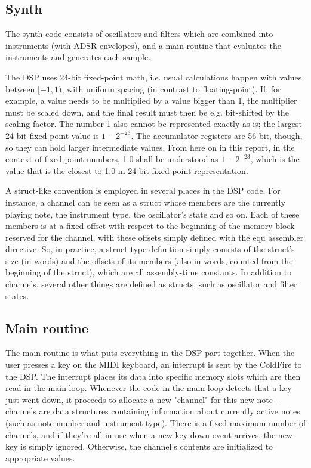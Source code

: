 \documentclass[10pt,a4paper,oneside]{article}
\begin{document}
\subsection{Synth}

The synth code consists of oscillators and filters which are combined into instruments (with ADSR envelopes), and a main routine that evaluates the instruments and generates each sample.

The DSP uses 24-bit fixed-point math, i.e. usual calculations happen with values between $[-1,1)$, with uniform spacing (in contrast to floating-point). If, for example, a value needs to be multiplied by a value bigger than 1, the multiplier must be scaled down, and the final result must then be e.g. bit-shifted by the scaling factor. The number 1 also cannot be represented exactly as-is; the largest 24-bit fixed point value is $1-2^{-23}$. The accumulator registers are 56-bit, though, so they can hold larger intermediate values. From here on in this report, in the context of fixed-point numbers, 1.0 shall be understood as $1-2^{-23}$, which is the value that is the closest to 1.0 in 24-bit fixed point representation.

A struct-like convention is employed in several places in the DSP code. For instance, a channel can be seen as a struct whose members are the currently playing note, the instrument type, the oscillator's state and so on. Each of these members is at a fixed offset with respect to the beginning of the memory block reserved for the channel, with these offsets simply defined with the equ assembler directive. So, in practice, a struct type definition simply consists of the struct's size (in words) and the offsets of its members (also in words, counted from the beginning of the struct), which are all assembly-time constants. In addition to channels, several other things are defined as structs, such as oscillator and filter states.

\subsection{Main routine}

The main routine is what puts everything in the DSP part together. When the user presses a key on the MIDI keyboard, an interrupt is sent by the ColdFire to the DSP. The interrupt places its data into specific memory slots which are then read in the main loop. Whenever the code in the main loop detects that a key just went down, it proceeds to allocate a new "channel" for this new note - channels are data structures containing information about currently active notes (such as note number and instrument type). There is a fixed maximum number of channels, and if they're all in use when a new key-down event arrives, the new key is simply ignored. Otherwise, the channel's contents are initialized to appropriate values.
\end{document}
